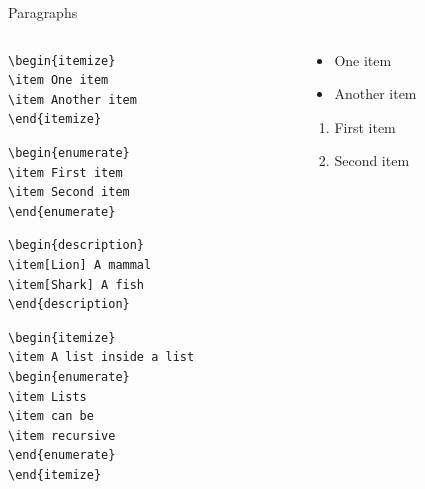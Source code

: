 \documentclass{beamer}
\begin{document}
\begin{frame}[fragile]{Paragraphs}
\begin{columns}
\begin{column}{6cm}
\vspace{-0.3cm}
\begin{lstlisting}
\begin{itemize}
\item One item
\item Another item
\end{itemize}
\end{lstlisting}
\begin{lstlisting}
\begin{enumerate}
\item First item
\item Second item
\end{enumerate}
\end{lstlisting}
\begin{lstlisting}
\begin{description}
\item[Lion] A mammal
\item[Shark] A fish
\end{description}
\end{lstlisting}
\begin{lstlisting}
\begin{itemize}
\item A list inside a list
\begin{enumerate}
\item Lists 
\item can be 
\item recursive
\end{enumerate}
\end{itemize}
\end{lstlisting}
\end{column}
\begin{column}{4cm}
\vspace{-1cm}
\footnotesize
\begin{itemize}
\item One item
\item Another item
\end{itemize}
\vspace{0.5cm}
\begin{enumerate}
\item First item
\item Second item
\end{enumerate}
\vspace{0.5cm}

\end{column}
\end{columns}
\end{frame}
\end{document}
